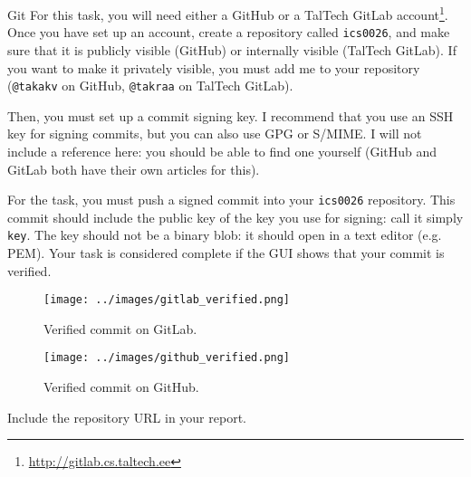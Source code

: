 \documentclass{homework}
\begin{document}
\begin{task}{Git}
  For this task, you will need either a GitHub or a TalTech GitLab account\footnote{\url{http://gitlab.cs.taltech.ee}}.
  Once you have set up an account, create a repository called \texttt{ics0026}, and make sure that it is publicly visible (GitHub) or internally visible (TalTech GitLab).
  If you want to make it privately visible, you must add me to your repository (\texttt{@takakv} on GitHub, \texttt{@takraa} on TalTech GitLab).

  Then, you must set up a commit signing key.
  I recommend that you use an SSH key for signing commits, but you can also use GPG or S/MIME.
  I will not include a reference here: you should be able to find one yourself (GitHub and GitLab both have their own articles for this).

  For the task, you must push a signed commit into your \texttt{ics0026} repository.
  This commit should include the public key of the key you use for signing: call it simply \texttt{key}.
  The key should not be a binary blob: it should open in a text editor (e.g. PEM).
  Your task is considered complete if the GUI shows that your commit is verified.

  \begin{figure}[h!]
    \center
    \texttt{[image: ../images/gitlab\_verified.png]}
    \caption{Verified commit on GitLab.}
  \end{figure}

  \begin{figure}[h!]
    \center
    \texttt{[image: ../images/github\_verified.png]}
    \caption{Verified commit on GitHub.}
  \end{figure}

  Include the repository URL in your report.
\end{task}
\end{document}
